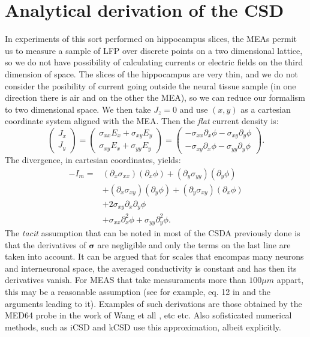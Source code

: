 \documentclass{article}
\newcommand{\cond}{\boldsymbol{\sigma}}
\begin{document}
\section{Analytical  derivation of the CSD}


In experiments of this sort performed on hippocampus slices, the
MEAs permit us to measure a sample of LFP over discrete points on a
two dimensional lattice, so we do not have possibility of
calculating currents or electric fields on the third dimension of space.
The slices of the hippocampus are very thin, and we do not consider
the posibility of current going outside the neural tissue sample (in one
direction there is air and on the other the MEA), so we
can reduce our formalism to two dimensional space. We then take
$J_z=0$ and use $(x,y)$ as a cartesian coordinate system aligned
with the MEA. Then the \emph{flat} current density  is:
\begin{equation}
  \begin{pmatrix}
    J_x\\
    J_y
  \end{pmatrix}  =
  \begin{pmatrix}
    \sigma_{xx}E_x+\sigma_{xy}E_y \\
    \sigma_{xy}E_x+\sigma_{yy}E_y 
  \end{pmatrix}=
  \begin{pmatrix}
    -\sigma_{xx}\partial_x \phi -\sigma_{xy}\partial_y \phi \\
    -\sigma_{xy}\partial_x \phi -\sigma_{yy}\partial_y \phi 
  \end{pmatrix}.
\end{equation}
The divergence, in cartesian coordinates, yields:
\begin{equation}\label{Imcart}
  \begin{split}
  -I_m= & (\partial_x \sigma_{xx}) (\partial_x \phi) +
  (\partial_y \sigma_{yy}) (\partial_y \phi)\\
& +(\partial_x \sigma_{xy}) (\partial_y \phi) +(\partial_y \sigma_{xy}) (\partial_x \phi)\\
& + 2\sigma_{xy} \partial_x\partial_y \phi \\
& + \sigma_{xx} \partial_x^2 \phi + \sigma_{yy} \partial_y^2 \phi.
\end{split}
 \end{equation}
The \emph{tacit} assumption that can be noted in most of the CSDA previously
done is that the derivatives of $\cond$ are negligible and only
the terms on the last line are  taken into account. 
It can be argued that for scales that
encompas many neurons and interneuronal space, the averaged conductivity is
constant and has then its derivatives vanish. For MEAS that take measuraments
more than $100 \mu m$ appart, this may be a reasonable assumption (see
for example, eq. 12 in \cite{Bedard11} and the arguments leading to it).
Examples of such derivations are those obtained by the MED64 probe in the
work of Wang et all \cite{Wang10}, etc etc. Also sofisticated
numerical methods, such as iCSD \cite{Pettersen2006, Leski11}
and kCSD \cite{Potworowsky2011} use this approximation, albeit
explicitly. 
\end{document}
